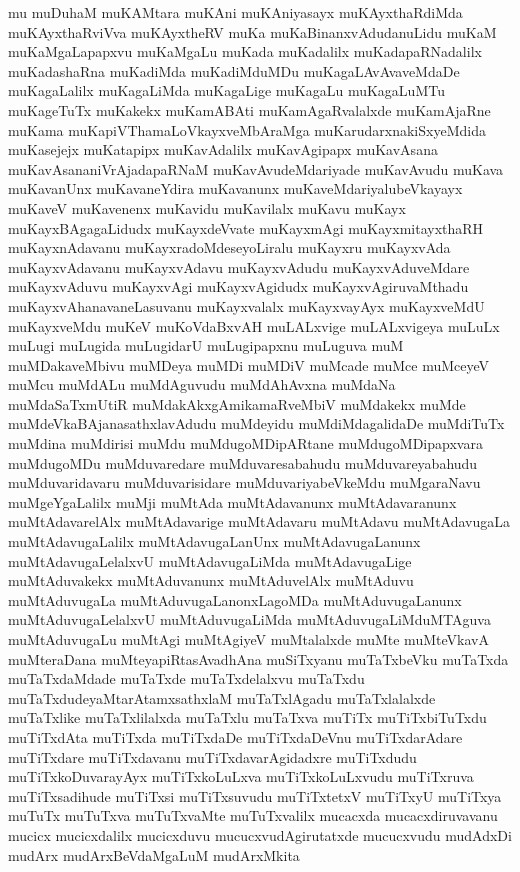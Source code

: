 {mu
muDuhaM
muKAMtara
muKAni
muKAniyasayx
muKAyxthaRdiMda
muKAyxthaRviVva
muKAyxtheRV
muKa
muKaBinanxvAdudanuLidu
muKaM
muKaMgaLapapxvu
muKaMgaLu
muKada
muKadalilx
muKadapaRNadalilx
muKadashaRna
muKadiMda
muKadiMduMDu
muKagaLAvAvaveMdaDe
muKagaLalilx
muKagaLiMda
muKagaLige
muKagaLu
muKagaLuMTu
muKageTuTx
muKakekx
muKamABAti
muKamAgaRvalalxde
muKamAjaRne
muKama
muKapiVThamaLoVkayxveMbAraMga
muKarudarxnakiSxyeMdida
muKasejejx
muKatapipx
muKavAdalilx
muKavAgipapx
muKavAsana
muKavAsananiVrAjadapaRNaM
muKavAvudeMdariyade
muKavAvudu
muKava
muKavanUnx
muKavaneYdira
muKavanunx
muKaveMdariyalubeVkayayx
muKaveV
muKavenenx
muKavidu
muKavilalx
muKavu
muKayx
muKayxBAgagaLidudx
muKayxdeVvate
muKayxmAgi
muKayxmitayxthaRH
muKayxnAdavanu
muKayxradoMdeseyoLiralu
muKayxru
muKayxvAda
muKayxvAdavanu
muKayxvAdavu
muKayxvAdudu
muKayxvAduveMdare
muKayxvAduvu
muKayxvAgi
muKayxvAgidudx
muKayxvAgiruvaMthadu
muKayxvAhanavaneLasuvanu
muKayxvalalx
muKayxvayAyx
muKayxveMdU
muKayxveMdu
muKeV
muKoVdaBxvAH
muLALxvige
muLALxvigeya
muLuLx
muLugi
muLugida
muLugidarU
muLugipapxnu
muLuguva
muM
muMDakaveMbivu
muMDeya
muMDi
muMDiV
muMcade
muMce
muMceyeV
muMcu
muMdALu
muMdAguvudu
muMdAhAvxna
muMdaNa
muMdaSaTxmUtiR
muMdakAkxgAmikamaRveMbiV
muMdakekx
muMde
muMdeVkaBAjanasathxlavAdudu
muMdeyidu
muMdiMdagalidaDe
muMdiTuTx
muMdina
muMdirisi
muMdu
muMdugoMDipARtane
muMdugoMDipapxvara
muMdugoMDu
muMduvaredare
muMduvaresabahudu
muMduvareyabahudu
muMduvaridavaru
muMduvarisidare
muMduvariyabeVkeMdu
muMgaraNavu
muMgeYgaLalilx
muMji
muMtAda
muMtAdavanunx
muMtAdavaranunx
muMtAdavarelAlx
muMtAdavarige
muMtAdavaru
muMtAdavu
muMtAdavugaLa
muMtAdavugaLalilx
muMtAdavugaLanUnx
muMtAdavugaLanunx
muMtAdavugaLelalxvU
muMtAdavugaLiMda
muMtAdavugaLige
muMtAduvakekx
muMtAduvanunx
muMtAduvelAlx
muMtAduvu
muMtAduvugaLa
muMtAduvugaLanonxLagoMDa
muMtAduvugaLanunx
muMtAduvugaLelalxvU
muMtAduvugaLiMda
muMtAduvugaLiMduMTAguva
muMtAduvugaLu
muMtAgi
muMtAgiyeV
muMtalalxde
muMte
muMteVkavA
muMteraDana
muMteyapiRtasAvadhAna
muSiTxyanu
muTaTxbeVku
muTaTxda
muTaTxdaMdade
muTaTxde
muTaTxdelalxvu
muTaTxdu
muTaTxdudeyaMtarAtamxsathxlaM
muTaTxlAgadu
muTaTxlalalxde
muTaTxlike
muTaTxlilalxda
muTaTxlu
muTaTxva
muTiTx
muTiTxbiTuTxdu
muTiTxdAta
muTiTxda
muTiTxdaDe
muTiTxdaDeVnu
muTiTxdarAdare
muTiTxdare
muTiTxdavanu
muTiTxdavarAgidadxre
muTiTxdudu
muTiTxkoDuvarayAyx
muTiTxkoLuLxva
muTiTxkoLuLxvudu
muTiTxruva
muTiTxsadihude
muTiTxsi
muTiTxsuvudu
muTiTxtetxV
muTiTxyU
muTiTxya
muTuTx
muTuTxva
muTuTxvaMte
muTuTxvalilx
mucacxda
mucacxdiruvavanu
mucicx
mucicxdalilx
mucicxduvu
mucucxvudAgirutatxde
mucucxvudu
mudAdxDi
mudArx
mudArxBeVdaMgaLuM
mudArxMkita
}
